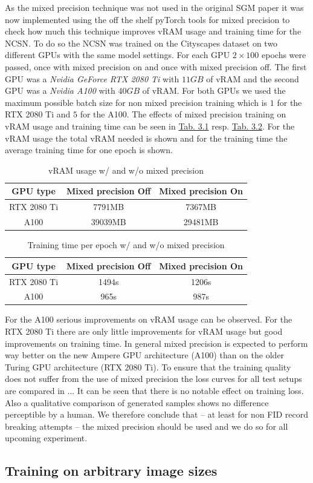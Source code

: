 As the mixed precision technique was not used in the original SGM paper \cite{score_3} it was now implemented using the off the shelf pyTorch tools for mixed precision to check how much this technique improves vRAM usage and training time for the NCSN. To do so the NCSN was trained on the Cityscapes dataset on two different GPUs with the same model settings. For each GPU $2\times100$ epochs were passed, once with mixed precision on and once with mixed precision off. The first GPU was a \textit{Nvidia GeForce RTX 2080 Ti} with $11GB$ of vRAM and the second GPU was a \textit{Nvidia A100} with $40GB$ of vRAM. For both GPUs we used the maximum possible batch size for non mixed precision training which is $1$ for the RTX 2080 Ti and $5$ for the A100. The effects of mixed precision training on vRAM usage and training time can be seen in \hyperref[tab:3.1]{Tab. 3.1} resp. \hyperref[tab:3.1]{Tab. 3.2}. For the vRAM usage the total vRAM needed is shown and for the training time the average training time for one epoch is shown.
%
\begin{table}[] \label{tab:3.1}
        \centering
    \begin{tabular}{c|c|c}
        GPU type        & Mixed precision \textbf{Off}    & Mixed precision \textbf{On} \\
        \hline
        RTX 2080 Ti     &  7791MB               & 7367MB\\
        A100            &  39039MB              & 29481MB
    \end{tabular}
    \caption{vRAM usage w/ and w/o mixed precision}
\end{table}
\begin{table}[b] \label{tab:3.2}
        \centering
    \begin{tabular}{c|c|c}
        GPU type        & Mixed precision \textbf{Off}    & Mixed precision \textbf{On} \\
        \hline
        RTX 2080 Ti     &  1494s                & 1206s    \\
        A100            &  965s                 & 987s
    \end{tabular}
    \caption{Training time per epoch w/ and w/o mixed precision}
\end{table}

For the A100 serious improvements on vRAM usage can be observed. For the RTX 2080 Ti there are only little improvements for vRAM usage but good improvements on training time. In general mixed precision is expected to perform way better on the new Ampere GPU
architecture (A100) than on the older Turing GPU architecture (RTX 2080 Ti). To ensure that the training quality does not suffer from the use of mixed precision the loss curves for all test setups are compared in ... It can be seen that there is no notable effect on training loss. Also a qualitative comparison of generated samples shows no difference perceptible by a human. We therefore conclude that – at least for non FID record breaking attempts – the mixed precision should be used and we do so for all upcoming experiment.

\subsection{Training on arbitrary image sizes} %

